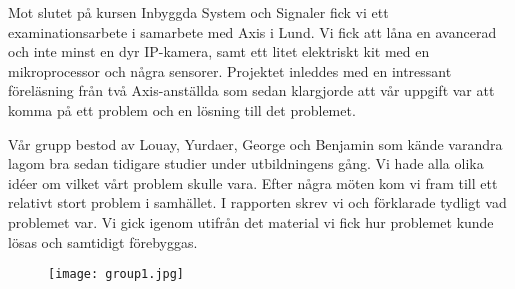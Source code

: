 



\begin{abstracts}        %

Mot slutet på kursen Inbyggda System och Signaler fick vi ett examinationsarbete i samarbete med Axis i Lund. Vi fick att låna en avancerad och inte minst en dyr IP-kamera, samt ett litet elektriskt kit med en mikroprocessor och några sensorer. Projektet inleddes med en intressant föreläsning från två Axis-anställda som sedan klargjorde att vår uppgift var att komma på ett problem och en lösning till det problemet. 

Vår grupp bestod av Louay, Yurdaer, George och Benjamin som kände varandra lagom bra sedan tidigare studier under utbildningens gång. Vi hade alla olika idéer om vilket vårt problem skulle vara. Efter några möten kom vi fram till ett relativt stort problem i samhället. I rapporten skrev vi och förklarade tydligt vad problemet var. Vi gick igenom utifrån det material vi fick hur problemet kunde lösas och samtidigt förebyggas. 


\begin{figure}[h]
  \texttt{[image: group1.jpg]}
  
  \label{fig:group1}
\end{figure}


\end{abstracts}



